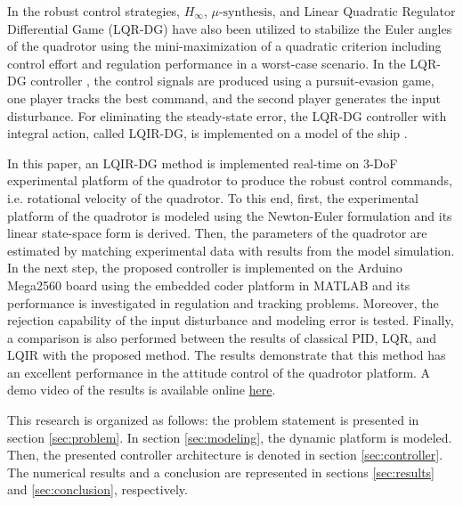 \documentclass[3p]{elsarticle}
\begin{document}
In the robust control strategies, $H_{\infty}$, $\mu\text{-synthesis}$, and Linear Quadratic Regulator Differential Game (LQR-DG) \cite{10025263} have also been utilized to stabilize the Euler angles of the quadrotor using the mini-maximization of a quadratic criterion including control effort and regulation performance in a worst-case scenario. In the LQR-DG controller \cite{GLIZER201522}, the control signals are produced using a pursuit-evasion game, one player tracks the best command, and the second player generates the input disturbance. For eliminating the steady-state error, the LQR-DG controller with integral action, called LQIR-DG, is implemented on a model of the ship \cite{6957349}.

In this paper, an LQIR-DG method is implemented real-time on 3-DoF experimental platform of the quadrotor to produce the robust control commands, i.e. rotational velocity of the quadrotor.
To this end, first, the experimental platform of the quadrotor is modeled using the Newton-Euler formulation and its linear state-space form is derived.
Then, the parameters of the quadrotor are estimated by matching experimental data with results from the model simulation.
In the next step, the proposed controller is implemented on the Arduino Mega2560 board using the embedded coder platform in MATLAB and its performance is investigated in regulation and tracking problems.
Moreover, the rejection capability of the input disturbance and modeling error is tested.
Finally, a comparison is also performed between the results of classical PID, LQR, and LQIR with the proposed method. The results demonstrate that this method has an excellent performance in the attitude control of the quadrotor platform.
A demo video of the results is available online
\href{https://drive.google.com/drive/folders/1DIJs3wmIpmwI8slyHeitA6Ebe-khKTCt?usp=share_link}{here}.


This research is organized as follows: the problem statement is presented in section \ref{sec:problem}. In section \ref{sec:modeling}, the dynamic
platform is modeled. Then, the presented controller architecture is denoted in section \ref{sec:controller}. The numerical results and a conclusion are represented in sections \ref{sec:results} and
\ref{sec:conclusion}, respectively.


\end{document}
